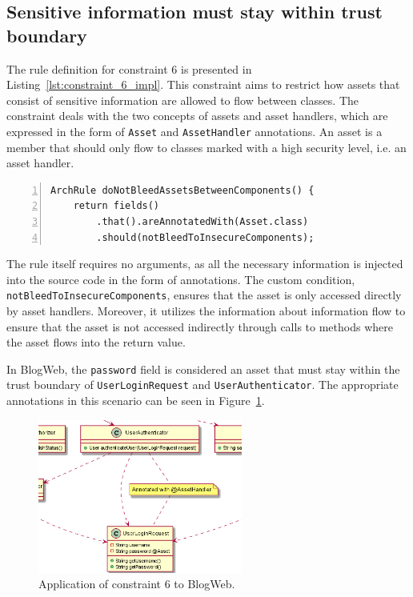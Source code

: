 \subsection{Sensitive information must stay within trust boundary}
The rule definition for constraint 6 is presented in Listing~\ref{lst:constraint_6_impl}.
This constraint aims to restrict how assets that consist of sensitive information are allowed to flow between classes. The constraint deals with the two concepts of assets and asset handlers, which are expressed in the form of \texttt{Asset} and \texttt{AssetHandler} annotations. An asset is a member that should only flow to classes marked with a high security level, i.e. an asset handler.

\begin{minipage}{\linewidth}
\begin{lstlisting}[caption={Rule definition for constraint 6.}, captionpos=b, label=lst:constraint_6_impl, numbers=left]
ArchRule doNotBleedAssetsBetweenComponents() {
    return fields()
        .that().areAnnotatedWith(Asset.class)
        .should(notBleedToInsecureComponents);
\end{lstlisting}
\end{minipage}

The rule itself requires no arguments, as all the necessary information is injected into the source code in the form of annotations. The custom condition, \texttt{notBleedTo\-InsecureComponents}, ensures that the asset is only accessed directly by asset handlers. Moreover, it utilizes the information about information flow to ensure that the asset is not accessed indirectly through calls to methods where the asset flows into the return value.

In BlogWeb, the \texttt{password} field is considered an asset that must stay within the trust boundary of \texttt{UserLoginRequest} and \texttt{UserAuthenticator}. The appropriate annotations in this scenario can be seen in Figure~\ref{fig:assets_toy_system}.

\begin{figure}[ht]
    \centering
    \includegraphics[width=0.6\textwidth]{figure/toyexamples/Assets.png}
    \caption{Application of constraint 6 to BlogWeb.}
    \label{fig:assets_toy_system}
\end{figure}

